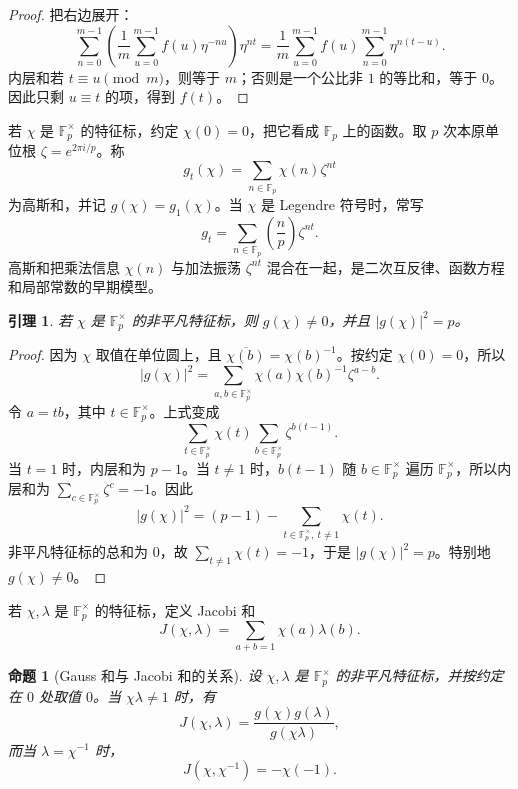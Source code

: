 \documentclass[11pt,a4paper,openany]{ctexbook}
\numberwithin{equation}{chapter}
\newcommand{\F}{\mathbb{F}}
\theoremstyle{plain}
\newtheorem{proposition}[theorem]{命题}
\newtheorem{lemma}[theorem]{引理}
\theoremstyle{definition}
\theoremstyle{remark}
\begin{document}
\begin{proof}
把右边展开：
\[
\sum_{n=0}^{m-1}\left(\frac1m\sum_{u=0}^{m-1}f(u)\eta^{-nu}\right)\eta^{nt}
=\frac1m\sum_{u=0}^{m-1}f(u)\sum_{n=0}^{m-1}\eta^{n(t-u)}.
\]
内层和若 $t\equiv u\pmod m$，则等于 $m$；否则是一个公比非 $1$ 的等比和，等于 $0$。因此只剩 $u\equiv t$ 的项，得到 $f(t)$。
\end{proof}

若 $\chi$ 是 $\F_p^\times$ 的特征标，约定 $\chi(0)=0$，把它看成 $\F_p$ 上的函数。取 $p$ 次本原单位根 $\zeta=e^{2\pi i/p}$。称
\[
g_t(\chi)=\sum_{n\in\F_p}\chi(n)\zeta^{nt}
\]
为高斯和，并记 $g(\chi)=g_1(\chi)$。当 $\chi$ 是 Legendre 符号时，常写
\[
g_t=\sum_{n\in\F_p}\left(\frac np\right)\zeta^{nt}.
\]
高斯和把乘法信息 $\chi(n)$ 与加法振荡 $\zeta^{nt}$ 混合在一起，是二次互反律、函数方程和局部常数的早期模型。

\begin{lemma}
若 $\chi$ 是 $\F_p^\times$ 的非平凡特征标，则 $g(\chi)\ne0$，并且 $|g(\chi)|^2=p$。
\end{lemma}

\begin{proof}
因为 $\chi$ 取值在单位圆上，且 $\overline{\chi(b)}=\chi(b)^{-1}$。按约定 $\chi(0)=0$，所以
\[
|g(\chi)|^2
=\sum_{a,b\in\F_p^\times}\chi(a)\chi(b)^{-1}\zeta^{a-b}.
\]
令 $a=tb$，其中 $t\in\F_p^\times$。上式变成
\[
\sum_{t\in\F_p^\times}\chi(t)
\sum_{b\in\F_p^\times}\zeta^{b(t-1)}.
\]
当 $t=1$ 时，内层和为 $p-1$。当 $t\ne1$ 时，$b(t-1)$ 随 $b\in\F_p^\times$ 遍历 $\F_p^\times$，所以内层和为 $\sum_{c\in\F_p^\times}\zeta^c=-1$。因此
\[
|g(\chi)|^2
=(p-1)-\sum_{t\in\F_p^\times,\ t\ne1}\chi(t).
\]
非平凡特征标的总和为 $0$，故 $\sum_{t\ne1}\chi(t)=-1$，于是 $|g(\chi)|^2=p$。特别地 $g(\chi)\ne0$。
\end{proof}

若 $\chi,\lambda$ 是 $\F_p^\times$ 的特征标，定义 Jacobi 和
\[
J(\chi,\lambda)=\sum_{a+b=1}\chi(a)\lambda(b).
\]
\begin{proposition}[Gauss 和与 Jacobi 和的关系]
设 $\chi,\lambda$ 是 $\F_p^\times$ 的非平凡特征标，并按约定在 $0$ 处取值 $0$。当 $\chi\lambda\ne1$ 时，有
\[
J(\chi,\lambda)=\frac{g(\chi)g(\lambda)}{g(\chi\lambda)},
\]
而当 $\lambda=\chi^{-1}$ 时，
\[
J(\chi,\chi^{-1})=-\chi(-1).
\]
\end{proposition}
\end{document}
